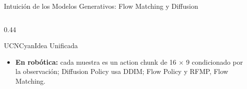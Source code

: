 \documentclass[aspectratio=169,10pt,xcolor={dvipsnames,table}]{beamer}
\newcommand{\FootnoteFont}{\fontsize{5}{6.2}\selectfont}                %
\newcommand{\CardHeightDouble}{42.5mm}     %
\newcommand{\RefNote}[1]{{\FootnoteFont\textcolor{TextDark!65}{\cite{#1}}}}
\begin{document}
\begin{frame}{Intuición de los Modelos Generativos: Flow Matching y Diffusion}
\begin{columns}[T, onlytextwidth]
\begin{column}{0.44\textwidth}
\begin{Card}[height=\CardHeightDouble]{UCNCyan}{Idea Unificada}
{\begin{itemize}
          \item[\textcolor{AgriGreen}{$\blacksquare$}] \textbf{En robótica:} cada muestra es un action chunk de 16 $\times$ 9 condicionado por la observación; Diffusion Policy usa DDIM; Flow Policy y RFMP, Flow Matching.
        \end{itemize}
        \RefNote{lipman2023flow,liu2023rectified,song2021sde,fang2025flowpolicy}}
      \end{Card}
    \end{column}
  \end{columns}
\end{frame}

\end{document}
